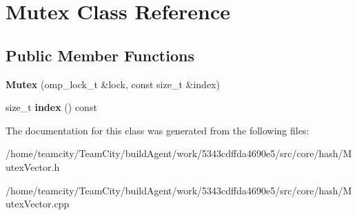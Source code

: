\hypertarget{classMutex}{}\section{Mutex Class Reference}
\label{classMutex}
\subsection*{Public Member Functions}
\begin{DoxyCompactItemize}
\item 
{\bfseries Mutex} (omp\+\_\+lock\+\_\+t \&lock, const size\+\_\+t \&index)\hypertarget{classMutex_a77dd5fee33e5d0354fff5f86fc87f02d}{}\label{classMutex_a77dd5fee33e5d0354fff5f86fc87f02d}

\item 
size\+\_\+t {\bfseries index} () const \hypertarget{classMutex_a6408411317bdb2f9532d7a1c77f2926b}{}\label{classMutex_a6408411317bdb2f9532d7a1c77f2926b}

\end{DoxyCompactItemize}


The documentation for this class was generated from the following files\+:\begin{DoxyCompactItemize}
\item 
/home/teamcity/\+Team\+City/build\+Agent/work/5343cdffda4690e5/src/core/hash/Mutex\+Vector.\+h\item 
/home/teamcity/\+Team\+City/build\+Agent/work/5343cdffda4690e5/src/core/hash/Mutex\+Vector.\+cpp\end{DoxyCompactItemize}
